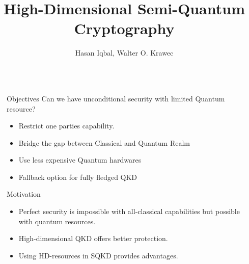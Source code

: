 \documentclass[final]{beamer}
\title{High-Dimensional Semi-Quantum Cryptography} %
\author{Hasan Iqbal, Walter O. Krawec} %
\institute{Computer Science and Engineering, UConn} %
\newlength{\sepwid}
\newlength{\onecolwid}
\begin{document}

\setlength{\belowcaptionskip}{2ex} %
\setlength\belowdisplayshortskip{2ex} %

\begin{frame}[t] %

\begin{columns}[t] %

\begin{column}{\sepwid}\end{column} %

\begin{column}{\onecolwid} %


\begin{alertblock}{Objectives}
Can we have unconditional security with limited Quantum resource?
\begin{itemize}
\item Restrict one parties capability. 
\item Bridge the gap between Classical and Quantum Realm
\item Use less expensive Quantum hardwares
\item Fallback option for fully fledged QKD
\end{itemize}

\end{alertblock}


\begin{block}{Motivation}

\begin{itemize}
\item Perfect security is impossible with all-classical capabilities but possible with quantum resources. 
\item High-dimensional QKD offers better protection.
\item Using HD-resources in SQKD provides advantages. 
\end{itemize}


\end{block}
\end{column}
\end{columns}
\end{frame}
\end{document}
